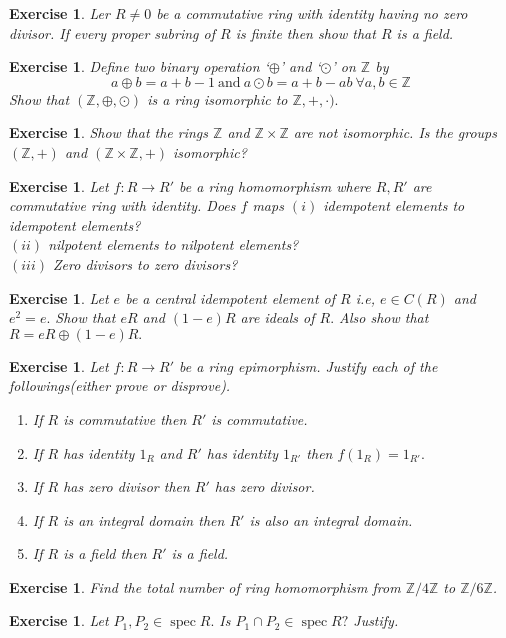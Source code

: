 \documentclass[11pt]{amsart}
\newtheorem{ex}[theorem]{Exercise}
\newcommand{\ZZ}{\mathbb Z}
\DeclareMathOperator{\spec}{\text{spec}}
\begin{document}
\begin{ex}
Ler $R\neq 0$ be a commutative ring with identity having no zero divisor. If every proper subring of $R$ is finite then show that $R$ is a field.
\end{ex}
\begin{ex}
Define two binary operation `$\oplus$' and `$\odot$' on ${\ZZ}$ by $$a\oplus b=a+b-1~\text{and}~a\odot b=a+b-ab~\forall a,b\in {\ZZ}$$ Show that $({\ZZ},\oplus,\odot)$ is a ring isomorphic to ${\ZZ},+,\cdot).$ 
\end{ex}
\begin{ex}
Show that the rings ${\ZZ}$ and ${\ZZ}\times {\ZZ}$ are not isomorphic. Is the groups $({\ZZ},+)$ and $({\ZZ}\times {\ZZ},+)$ isomorphic?
\end{ex}
\begin{ex}
Let $f:R\to R'$ be a ring homomorphism where $R,R'$ are commutative ring with identity. Does $f$ maps $(i)$ idempotent elements to idempotent elements?\\
$(ii)$ nilpotent elements to nilpotent elements?\\
$(iii)$ Zero divisors to zero divisors?
\end{ex}
\begin{ex}
Let $e$ be a central idempotent element of $R$ i.e, $e\in C(R)$ and $e^2=e.$ Show that $eR$ and $(1-e)R$ are ideals of $R.$ Also show that $R=eR\oplus (1-e)R.$
\end{ex}
\begin{ex}
Let $f:R\to R'$ be a ring epimorphism. Justify each of the followings(either prove or disprove).
\begin{enumerate}
\item If $R$ is commutative then $R'$ is commutative.
\item If $R$ has identity $1_R$ and $R'$ has identity $1_{R'}$ then $f(1_R)=1_{R'}.$
\item If $R$ has zero divisor then $R'$ has zero divisor.
\item If $R$ is an integral domain then $R'$ is also an integral domain.
\item If $R$ is a field then $R'$ is a field.
\end{enumerate}
\end{ex}
\begin{ex}
Find the total number of ring homomorphism from ${\ZZ}/4{\ZZ}$ to ${\ZZ}/6{\ZZ}$. 
\end{ex}
\begin{ex}
Let $P_1, P_2\in \spec R.$ Is $P_1\cap P_2\in \spec R?$ Justify.
\end{ex}
\end{document}
